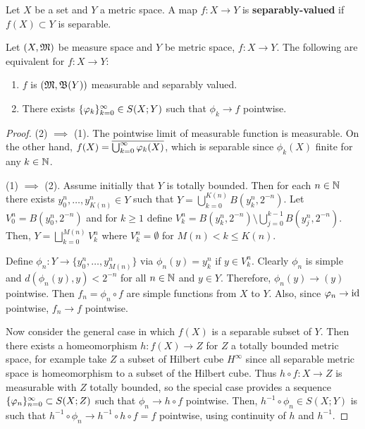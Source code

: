 \documentclass[a4paper]{article}
\begin{document}
\begin{defi}
Let $X$ be a set and $Y$ a metric space. A map $f: X 
\to Y$ is \textbf{separably-valued} 
if $f(X) \subset Y$ is separable.
\end{defi}

\begin{thm}
  Let $(X, \mathfrak{M})$ be measure space and $Y$ be metric space, 
  $f : X \to Y$. The following are equivalent for 
  $f: X \to Y$: 
  \begin{enumerate}
    \item $f$ is $(\mathfrak{M}, \mathfrak{B}(Y))$ measurable and 
    separably valued.
    \item There exists $\{ \varphi_k \}_{k=0}^\infty \in S(X; Y)$
    such that $\phi_k \to f$ pointwise.
  \end{enumerate}
\end{thm}

\begin{proof}

(2) $\implies$ (1). The pointwise limit of measurable function 
is measurable. On the other hand, $f(X) = \overline{\bigcup_{k=0}^\infty \varphi_k(X)}$,
which is separable since $\phi_k(X)$ finite for any $k \in \mathbb{N}$.

(1) $\implies$ (2). Assume initially that $Y$ is totally bounded.
Then for each $n \in \mathbb{N}$ there exists $y^n_0, \dots, y^n_{K(n)} \in Y$
such that $Y = \bigcup_{k=0}^{K(n)} B(y^n_k, 2^{-n})$. 
Let $V^n_0 = B(y_0^n, 2^{-n})$ and for $k \geq 1$ define
$V^n_k = B(y^n_k, 2^{-n}) \setminus \bigcup_{j=0}^{k-1} 
B(y^n_j, 2^{-n})$. Then, $Y = \bigsqcup_{k=0}^{M(n)} V_k^n$
where $V^n_k = \emptyset$ for $M(n) < k \leq K(n)$.

Define $\phi_n: Y \to \{ y_0^n, \dots, y_{M(n)}^n \}$
via $\phi_n(y) = y_k^n$ if $y \in V_k^n$. Clearly $\phi_n$
is simple and $d(\phi_n(y), y) < 2^{-n}$ for all $n \in \mathbb{N}$
and $y \in Y$. Therefore, $\phi_n(y) \to (y)$ pointwise.
Then $f_n = \phi_n \circ f$ are simple functions
from $X$ to $Y$. Also, since $\varphi_n \to \operatorname{id}$ pointwise, 
$f_n \to f$ pointwise.

Now consider the general case in which $f(X)$ is a separable
subset of $Y$. Then there exists a homeomorphism $h: f(X) 
\to Z$ for $Z$ a totally bounded metric space, for example
take $Z$ a subset of Hilbert cube $H^\infty$ since 
all separable metric space is homeomorphism to a subset of 
the Hilbert cube. Thus $h \circ f: X \to Z$ is measurable
with $Z$ totally bounded, so the special case provides 
a sequence $\{ \varphi_n \}_{n=0}^\infty \subset S(X; Z)$ such that 
$\phi_n \to h \circ f$ pointwise. Then, 
$h^{-1} \circ \phi_n \in S(X; Y)$ is such that 
$h^{-1} \circ \phi_n \to h^{-1} \circ h \circ f = f$
pointwise, using continuity of $h$ and $h^{-1}$.

\end{proof}
\end{document}
